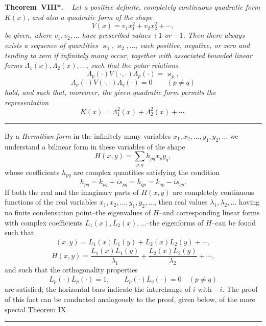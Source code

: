 \documentclass[b5paper,twoside]{article}
\makeatletter
\newcommand{\hilbertstatementname}[2]{%
  \textbf{#1\if\relax\detokenize{#2}\relax\else\ #2\fi.}%
}
\newenvironment{theorem}[1][]{%
  \par\addvspace{.7\baselineskip}%
  \phantomsection
  \protected@edef\@currentlabel{#1}%
  \noindent\hilbertstatementname{Theorem}{#1}\ \itshape\ignorespaces
}{%
  \par\addvspace{.7\baselineskip}%
}
\newcommand{\originalpage}[1]{\phantomsection\label{origpage:#1}}
\makeatother
\begin{document}
\begin{theorem}[VIII*]\label{thm:VIIIstar}
Let a positive definite, completely continuous quadratic form $K(x)$, and
also a quadratic form of the shape
\[
  V(x)=v_1x_1^2+v_2x_2^2+\cdots,
\]
be given, where $v_1,v_2,\ldots$ have prescribed values $+1$ or $-1$. Then
there always exists a sequence of quantities
$\varkappa_1,\varkappa_2,\ldots$, each positive, negative, or zero and tending
to zero if infinitely many occur, together with associated bounded linear
forms $\Lambda_1(x),\Lambda_2(x),\ldots$, such that the
polar relations
\[
  \Lambda_p(\mathord{\cdot})V(\mathord{\cdot},\mathord{\cdot})
  \Lambda_p(\mathord{\cdot})=\varkappa_p,
\]
\[
  \Lambda_p(\mathord{\cdot})V(\mathord{\cdot},\mathord{\cdot})
  \Lambda_q(\mathord{\cdot})=0\qquad(p\ne q)
\]
hold, and such that, moreover, the given quadratic form permits the
representation
\[
  K(x)=\Lambda_1^2(x)+\Lambda_2^2(x)+\cdots.
\]
\end{theorem}

\begin{center}
  \rule{0.22\linewidth}{0.4pt}
\end{center}

\originalpage{216}
By a \emph{Hermitian form} in the infinitely many variables
$x_1,x_2,\ldots,y_1,y_2,\ldots$ we understand a bilinear form in these
variables of the shape
\[
  H(x,y)=\sum_{p,q}h_{pq}x_py_q,
\]
whose coefficients $h_{pq}$ are complex quantities satisfying the condition
\[
  h_{pq}=k_{pq}+is_{pq}=\overline{h}_{qp}=k_{qp}-is_{qp}.
\]
If both the real and the imaginary parts of $H(x,y)$ are completely
continuous functions of the real variables
$x_1,x_2,\ldots,y_1,y_2,\ldots$, then real values
$\lambda_1,\lambda_2,\ldots$ having no finite condensation point--the
eigenvalues of $H$--and corresponding linear forms with complex coefficients
$L_1(x),L_2(x),\ldots$--the eigenforms of $H$--can be found such that
\[
  (x,y)=L_1(x)\overline{L}_1(y)+L_2(x)\overline{L}_2(y)+\cdots,
\]
\[
  H(x,y)=\frac{L_1(x)\overline{L}_1(y)}{\lambda_1}
         +\frac{L_2(x)\overline{L}_2(y)}{\lambda_2}+\cdots,
\]
and such that the orthogonality properties
\[
  L_p(\mathord{\cdot})\overline{L}_p(\mathord{\cdot})=1,
  \qquad
  L_p(\mathord{\cdot})\overline{L}_q(\mathord{\cdot})=0
  \quad(p\ne q)
\]
are satisfied; the horizontal bars indicate the interchange of $i$ with
$-i$. The proof of this fact can be conducted analogously to the proof,
given below, of the more special \hyperref[thm:IX]{Theorem IX}.

\begin{center}
  \rule{0.22\linewidth}{0.4pt}
\end{center}
\end{document}
